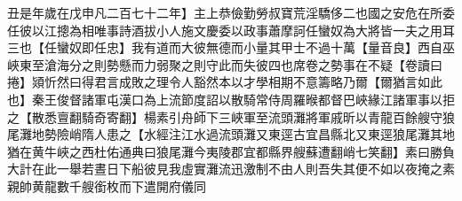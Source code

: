 丑是年歲在戊申凡二百七十二年】主上恭儉勤勞叔寶荒淫驕侈二也國之安危在所委任彼以江摠為相唯事詩酒拔小人施文慶委以政事蕭摩訶任蠻奴為大將皆一夫之用耳三也【任蠻奴即任忠】我有道而大彼無德而小量其甲士不過十萬【量音良】西自巫峽東至滄海分之則勢懸而力弱聚之則守此而失彼四也席卷之勢事在不疑【卷讀曰捲】熲忻然曰得君言成敗之理令人豁然本以才學相期不意籌略乃爾【爾猶言如此也】秦王俊督諸軍屯漢口為上流節度詔以散騎常侍周羅㬋都督巴峽緣江諸軍事以拒之【散悉亶翻騎奇寄翻】楊素引舟師下三峽軍至流頭灘將軍戚昕以青龍百餘艘守狼尾灘地勢險峭隋人患之【水經注江水過流頭灘又東逕古宜昌縣北又東逕狼尾灘其地猶在黄牛峽之西杜佑通典曰狼尾灘今夷陵郡宜都縣界艘蘇遭翻峭七笑翻】素曰勝負大計在此一舉若晝日下船彼見我虛實灘流迅激制不由人則吾失其便不如以夜掩之素親帥黄龍數千艘銜枚而下遣開府儀同